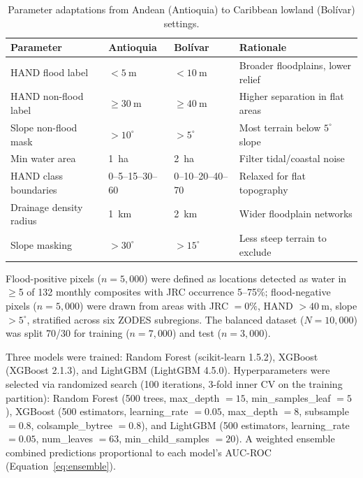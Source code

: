 \documentclass{article}
\begin{document}
\begin{table}[htbp]
\caption{Parameter adaptations from Andean (Antioquia) to Caribbean lowland (Bol\'ivar) settings.}
\label{tab:threshold_adaptation}
\centering
\footnotesize
\begin{tabular}{llll}
\toprule
\textbf{Parameter} & \textbf{Antioquia} & \textbf{Bol\'ivar} & \textbf{Rationale} \\
\midrule
HAND flood label & $< \SI{5}{\metre}$ & $< \SI{10}{\metre}$ & Broader floodplains, lower relief \\
HAND non-flood label & $\geq \SI{30}{\metre}$ & $\geq \SI{40}{\metre}$ & Higher separation in flat areas \\
Slope non-flood mask & $> 10^{\circ}$ & $> 5^{\circ}$ & Most terrain below $5^{\circ}$ slope \\
Min water area & \SI{1}{\hectare} & \SI{2}{\hectare} & Filter tidal/coastal noise \\
HAND class boundaries & 0--5--15--30--60 & 0--10--20--40--70 & Relaxed for flat topography \\
Drainage density radius & \SI{1}{\kilo\metre} & \SI{2}{\kilo\metre} & Wider floodplain networks \\
Slope masking & $> 30^{\circ}$ & $> 15^{\circ}$ & Less steep terrain to exclude \\
\bottomrule
\end{tabular}
\end{table}

Flood-positive pixels ($n = 5{,}000$) were defined as locations detected as water in $\geq$5 of 132 monthly composites with JRC occurrence 5--75\%; flood-negative pixels ($n = 5{,}000$) were drawn from areas with JRC $= 0\%$, HAND $> \SI{40}{\metre}$, slope $> 5^{\circ}$, stratified across six ZODES subregions. The balanced dataset ($N = 10{,}000$) was split 70/30 for training ($n = 7{,}000$) and test ($n = 3{,}000$).

Three models were trained: Random Forest \citep{Breiman2001} (scikit-learn 1.5.2), XGBoost \citep{Chen2016} (XGBoost 2.1.3), and LightGBM \citep{Ke2017} (LightGBM 4.5.0). Hyperparameters were selected via randomized search (100 iterations, 3-fold inner CV on the training partition): Random Forest (500 trees, max\_depth $= 15$, min\_samples\_leaf $= 5$), XGBoost (500 estimators, learning\_rate $= 0.05$, max\_depth $= 8$, subsample $= 0.8$, colsample\_bytree $= 0.8$), and LightGBM (500 estimators, learning\_rate $= 0.05$, num\_leaves $= 63$, min\_child\_samples $= 20$). A weighted ensemble combined predictions proportional to each model's AUC-ROC (Equation~\ref{eq:ensemble}).
\end{document}
